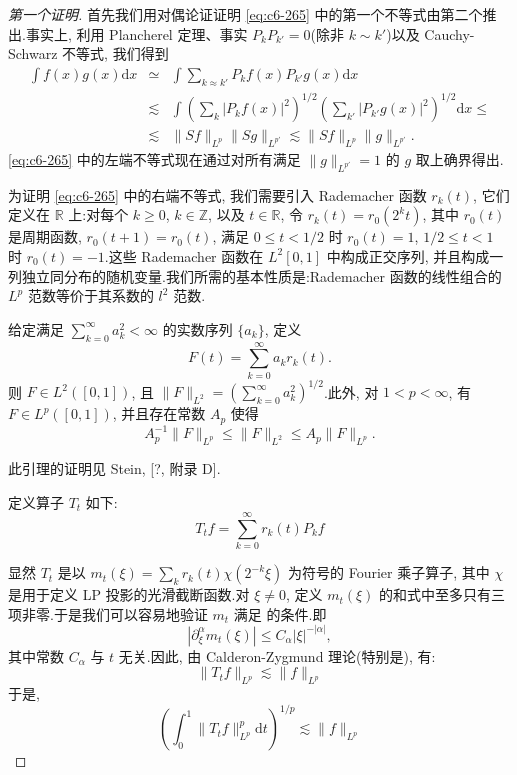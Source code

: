 \begin{proof}[第一个证明]
首先我们用对偶论证证明 \eqref{eq:c6-265} 中的第一个不等式由第二个推出.事实上, 利用 Plancherel 定理、事实 $P_k P_{k'} = 0$(除非 $k \sim k'$)以及 Cauchy-Schwarz 不等式, 我们得到
\[
\begin{array}{lll}
\int f(x) g(x) \mathrm{d}x &\simeq& \int \sum_{k \approx k'} P_k f(x) P_{k'} g(x) \mathrm{d}x \\
&\lesssim& \int \left(\sum_k |P_k f(x)|^2\right)^{1/2} \left(\sum_{k'} |P_{k'} g(x)|^2\right)^{1/2} \mathrm{d}x \leq \\
&\lesssim& \|Sf\|_{L^p} \|Sg\|_{L^{p'}} \lesssim \|Sf\|_{L^p} \|g\|_{L^{p'}}.
\end{array}
\]
\eqref{eq:c6-265} 中的左端不等式现在通过对所有满足 $\|g\|_{L^{p'}} = 1$ 的 $g$ 取上确界得出.

为证明 \eqref{eq:c6-265} 中的右端不等式, 我们需要引入 Rademacher 函数 $r_k(t)$, 它们定义在 $\mathbb{R}$ 上:对每个 $k \geq 0$, $k \in \mathbb{Z}$, 以及 $t \in \mathbb{R}$, 令 $r_k(t) = r_0(2^k t)$, 其中 $r_0(t)$ 是周期函数, $r_0(t+1) = r_0(t)$, 满足 $0 \leq t < 1/2$ 时 $r_0(t) = 1$, $1/2 \leq t < 1$ 时 $r_0(t) = -1$.这些 Rademacher 函数在 $L^2[0, 1]$ 中构成正交序列, 并且构成一列独立同分布的随机变量.我们所需的基本性质是:Rademacher 函数的线性组合的 $L^p$ 范数等价于其系数的 $l^2$ 范数.

\begin{lemma}\label{lem:c6-6.14}
给定满足 $\sum_{k=0}^{\infty} a_k^2 < \infty$ 的实数序列 $\{a_k\}$, 定义
\[
F(t) = \sum_{k=0}^{\infty} a_k r_k(t).
\]
则 $F \in L^2([0, 1])$, 且 $\|F\|_{L^2} = (\sum_{k=0}^{\infty} a_k^2)^{1/2}$.此外, 对 $1 < p < \infty$, 有 $F \in L^p([0, 1])$, 并且存在常数 $A_p$ 使得
\[
A_p^{-1} \|F\|_{L^p} \leq \|F\|_{L^2} \leq A_p \|F\|_{L^p}.
\]
\end{lemma}

此引理的证明见 Stein, [?, 附录 D].

定义算子 $T_t$ 如下:
\[
T_t f = \sum_{k=0}^{\infty} r_k(t) P_k f
\]

显然 $T_t$ 是以 $m_t(\xi) = \sum_k r_k(t) \chi(2^{-k}\xi)$ 为符号的 Fourier 乘子算子, 其中 $\chi$ 是用于定义 LP 投影的光滑截断函数.对 $\xi \neq 0$, 定义 $m_t(\xi)$ 的和式中至多只有三项非零.于是我们可以容易地验证 $m_t$ 满足 的条件.即
\[
|\partial_\xi^\alpha m_t(\xi)| \leq C_\alpha |\xi|^{-|\alpha|},
\]
其中常数 $C_\alpha$ 与 $t$ 无关.因此, 由 Calderon-Zygmund 理论(特别是), 有:
\[
\|T_t f\|_{L^p} \lesssim \|f\|_{L^p}
\]
于是,
\[
\left(\int_0^1 \|T_t f\|^p_{L^p} \mathrm{d}t\right)^{1/p} \lesssim \|f\|_{L^p}
\]


\end{proof}
